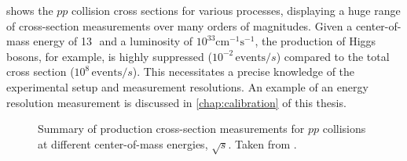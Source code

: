 
 shows the $pp$ collision cross sections for various processes, displaying a huge range of cross-section measurements over many orders of magnitudes. 
Given a center-of-mass energy of 13\,\TeV\ and a luminosity of $10^{33}\mathrm{cm^{-1}s^{-1}}$, the production of Higgs bosons, for example, is highly suppressed ($10^{-2}\,\text{events}/s$) compared to the total cross section ($10^8\,\text{events}/s$).
This necessitates a precise knowledge of the experimental setup and measurement resolutions. An example of an energy resolution measurement is discussed in \cref{chap:calibration} of this thesis. 


\begin{figure}
  \caption[Summary of production cross-sections measurements for $pp$ collisions at different center-of-mass energy.]{
    Summary of production cross-section measurements for $pp$ collisions at different center-of-mass energies, $\sqrt{s}$. Taken from .
    }
  \label{fig:xsec}
\end{figure}


